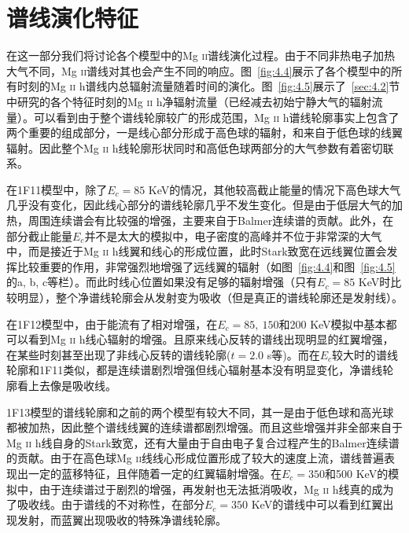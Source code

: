 \section{谱线演化特征}\label{sec:4.3}
在这一部分我们将讨论各个模型中的Mg \textsc{ii}谱线演化过程。由于不同非热电子加热大气不同，Mg \textsc{ii}谱线对其也会产生不同的响应。图~\ref{fig:4.4}展示了各个模型中的所有时刻的Mg \textsc{ii} h谱线内总辐射流量随着时间的演化。图~\ref{fig:4.5}展示了~\ref{sec:4.2}节中研究的各个特征时刻的Mg \textsc{ii} h净辐射流量（已经减去初始宁静大气的辐射流量）。可以看到由于整个谱线轮廓较广的形成范围，Mg \textsc{ii} h谱线轮廓事实上包含了两个重要的组成部分，一是线心部分形成于高色球的辐射，和来自于低色球的线翼辐射。因此整个Mg \textsc{ii} h线轮廓形状同时和高低色球两部分的大气参数有着密切联系。

在1F11模型中，除了$E_c=85$ KeV的情况，其他较高截止能量的情况下高色球大气几乎没有变化，因此线心部分的谱线轮廓几乎不发生变化。但是由于低层大气的加热，周围连续谱会有比较强的增强，主要来自于Balmer连续谱的贡献。此外，在部分截止能量$E_c$并不是太大的模拟中，电子密度的高峰并不位于非常深的大气中，而是接近于Mg \textsc{ii} h线翼和线心的形成位置，此时Stark致宽在远线翼位置会发挥比较重要的作用，非常强烈地增强了远线翼的辐射（如图~\ref{fig:4.4}和图~\ref{fig:4.5}的a, b, c等栏）。而此时线心位置如果没有足够的辐射增强（只有$E_c=85$ KeV时比较明显），整个净谱线轮廓会从发射变为吸收（但是真正的谱线轮廓还是发射线）。

在1F12模型中，由于能流有了相对增强，在$E_c=85,\ 150$和200 KeV模拟中基本都可以看到Mg \textsc{ii} h线心辐射的增强。且原来线心反转的谱线出现明显的红翼增强，在某些时刻甚至出现了非线心反转的谱线轮廓($t=2.0$ s等)。而在$E_c$较大时的谱线轮廓和1F11类似，都是连续谱剧烈增强但线心辐射基本没有明显变化，净谱线轮廓看上去像是吸收线。

1F13模型的谱线轮廓和之前的两个模型有较大不同，其一是由于低色球和高光球都被加热，因此整个谱线线翼的连续谱都剧烈增强。而且这些增强并非全部来自于Mg \textsc{ii} h线自身的Stark致宽，还有大量由于自由电子复合过程产生的Balmer连续谱的贡献。由于在高色球Mg \textsc{ii}线线心形成位置形成了较大的速度上流，谱线普遍表现出一定的蓝移特征，且伴随着一定的红翼辐射增强。在$E_c = 350$和500 KeV的模拟中，由于连续谱过于剧烈的增强，再发射也无法抵消吸收，Mg \textsc{ii} h线真的成为了吸收线。由于谱线的不对称性，在部分$E_c = 350$ KeV的谱线中可以看到红翼出现发射，而蓝翼出现吸收的特殊净谱线轮廓。


